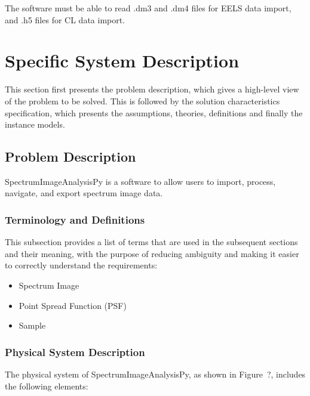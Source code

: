 \documentclass[12pt]{article}
\newcommand{\progname}{SpectrumImageAnalysisPy} %
\begin{document}
The software must be able to read .dm3 and .dm4 files for EELS data import, and .h5 files for CL data import.

\section{Specific System Description}

This section first presents the problem description, which gives a high-level
view of the problem to be solved.  This is followed by the solution characteristics
specification, which presents the assumptions, theories, definitions and finally
the instance models.  

\subsection{Problem Description} \label{Sec_pd}

\progname{} is a software to allow users to import, process, navigate, and export spectrum image data. 

\subsubsection{Terminology and  Definitions}

This subsection provides a list of terms that are used in the subsequent
sections and their meaning, with the purpose of reducing ambiguity and making it
easier to correctly understand the requirements:

\begin{itemize}
	\item Spectrum Image
	\item Point Spread Function (PSF)
	\item Sample
\end{itemize}

\subsubsection{Physical System Description}

The physical system of \progname{}, as shown in Figure~?,
includes the following elements:
\end{document}
